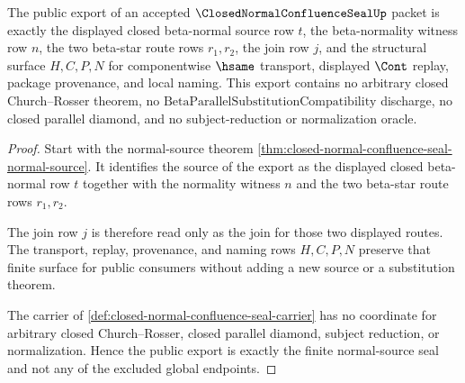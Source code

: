 \begin{theorem}
\label{thm:closed-normal-confluence-seal-public-export}
The public export of an accepted $\ClosedNormalConfluenceSealUp$ packet is
exactly the displayed closed beta-normal source row $t$, the beta-normality
witness row $n$, the two beta-star route rows $r_1,r_2$, the join row $j$, and
the structural surface $H,C,P,N$ for componentwise $\hsame$ transport,
displayed $\Cont$ replay, package provenance, and local naming. This export
contains no arbitrary closed Church--Rosser theorem, no
$\mathrm{BetaParallelSubstitutionCompatibility}$ discharge, no closed parallel
diamond, and no subject-reduction or normalization oracle.
\end{theorem}
\begin{proof}
Start with the normal-source theorem
\autoref{thm:closed-normal-confluence-seal-normal-source}. It identifies the
source of the export as the displayed closed beta-normal row $t$ together with
the normality witness $n$ and the two beta-star route rows $r_1,r_2$.

The join row $j$ is therefore read only as the join for those two displayed
routes. The transport, replay, provenance, and naming rows $H,C,P,N$ preserve
that finite surface for public consumers without adding a new source or a
substitution theorem.

The carrier of \autoref{def:closed-normal-confluence-seal-carrier} has no
coordinate for arbitrary closed Church--Rosser, closed parallel diamond,
subject reduction, or normalization. Hence the public export is exactly the
finite normal-source seal and not any of the excluded global endpoints.
\end{proof}

